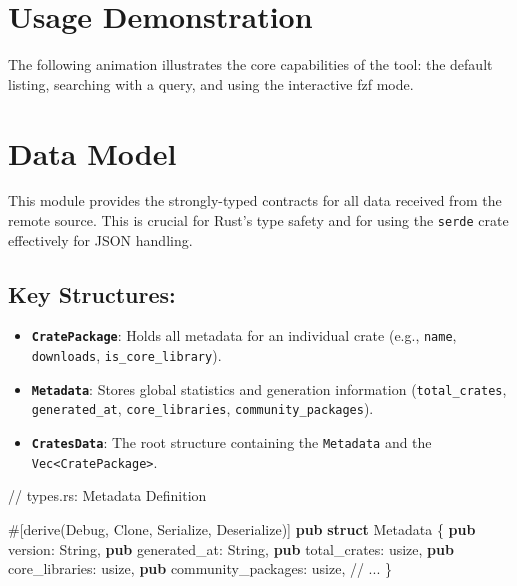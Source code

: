 \documentclass[
  letterpaper,
  DIV=11,
  numbers=noendperiod]{scrreprt}
\newenvironment{Shaded}{\begin{snugshade}}{\end{snugshade}}
\newcommand{\AttributeTok}[1]{\textcolor[rgb]{0.40,0.45,0.13}{#1}}
\newcommand{\BuiltInTok}[1]{\textcolor[rgb]{0.00,0.23,0.31}{#1}}
\newcommand{\CommentTok}[1]{\textcolor[rgb]{0.37,0.37,0.37}{#1}}
\newcommand{\DataTypeTok}[1]{\textcolor[rgb]{0.68,0.00,0.00}{#1}}
\newcommand{\KeywordTok}[1]{\textcolor[rgb]{0.00,0.23,0.31}{\textbf{#1}}}
\newcommand{\NormalTok}[1]{\textcolor[rgb]{0.00,0.23,0.31}{#1}}
\newcommand{\OperatorTok}[1]{\textcolor[rgb]{0.37,0.37,0.37}{#1}}
\begin{document}
\chapter{Usage Demonstration}\label{usage-demonstration}

The following animation illustrates the core capabilities of the tool:
the default listing, searching with a query, and using the interactive
fzf mode.

\chapter{Data Model}\label{data-model}

This module provides the strongly-typed contracts for all data received
from the remote source. This is crucial for Rust's type safety and for
using the \texttt{serde} crate effectively for JSON handling.

\section{\texorpdfstring{\textbf{Key
Structures:}}{Key Structures:}}\label{key-structures}

\begin{itemize}
\item
  \textbf{\texttt{CratePackage}}: Holds all metadata for an individual
  crate (e.g., \texttt{name}, \texttt{downloads},
  \texttt{is\_core\_library}).
\item
  \textbf{\texttt{Metadata}}: Stores global statistics and generation
  information (\texttt{total\_crates}, \texttt{generated\_at},
  \texttt{core\_libraries}, \texttt{community\_packages}).
\item
  \textbf{\texttt{CratesData}}: The root structure containing the
  \texttt{Metadata} and the
  \texttt{Vec\textless{}CratePackage\textgreater{}}.
\end{itemize}

\begin{Shaded}
\begin{Highlighting}[]
\CommentTok{// types.rs: Metadata Definition}

\AttributeTok{\#[}\NormalTok{derive}\AttributeTok{(}\BuiltInTok{Debug}\OperatorTok{,} \BuiltInTok{Clone}\OperatorTok{,}\NormalTok{ Serialize}\OperatorTok{,}\NormalTok{ Deserialize}\AttributeTok{)]}
\KeywordTok{pub} \KeywordTok{struct}\NormalTok{ Metadata }\OperatorTok{\{}
    \KeywordTok{pub}\NormalTok{ version}\OperatorTok{:} \DataTypeTok{String}\OperatorTok{,}
    \KeywordTok{pub}\NormalTok{ generated\_at}\OperatorTok{:} \DataTypeTok{String}\OperatorTok{,}
    \KeywordTok{pub}\NormalTok{ total\_crates}\OperatorTok{:} \DataTypeTok{usize}\OperatorTok{,}
    \KeywordTok{pub}\NormalTok{ core\_libraries}\OperatorTok{:} \DataTypeTok{usize}\OperatorTok{,}
    \KeywordTok{pub}\NormalTok{ community\_packages}\OperatorTok{:} \DataTypeTok{usize}\OperatorTok{,}
    \CommentTok{// ...}
\OperatorTok{\}}
\end{Highlighting}
\end{Shaded}
\end{document}
